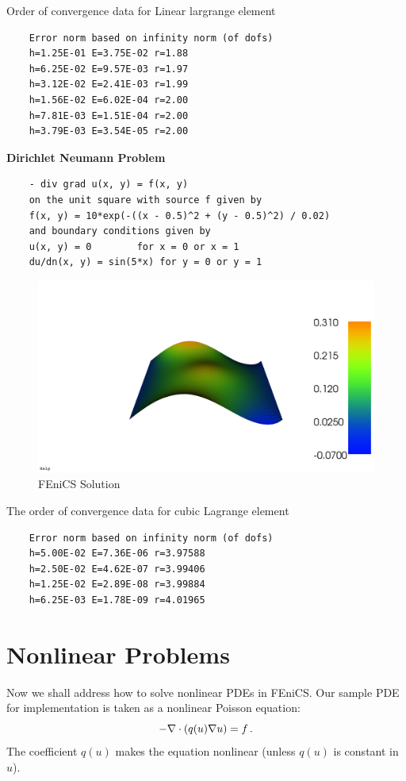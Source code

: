 Order of convergence data for Linear largrange element
\begin{lstlisting}
	Error norm based on infinity norm (of dofs)
	h=1.25E-01 E=3.75E-02 r=1.88
	h=6.25E-02 E=9.57E-03 r=1.97
	h=3.12E-02 E=2.41E-03 r=1.99
	h=1.56E-02 E=6.02E-04 r=2.00
	h=7.81E-03 E=1.51E-04 r=2.00
	h=3.79E-03 E=3.54E-05 r=2.00
\end{lstlisting}
\pagebreak
\noindent \textbf{Dirichlet Neumann Problem}
\begin{lstlisting}
	- div grad u(x, y) = f(x, y)
	on the unit square with source f given by
	f(x, y) = 10*exp(-((x - 0.5)^2 + (y - 0.5)^2) / 0.02)
	and boundary conditions given by
	u(x, y) = 0        for x = 0 or x = 1
	du/dn(x, y) = sin(5*x) for y = 0 or y = 1
\end{lstlisting}
\begin{figure}[h]
	\center
	\includegraphics[scale = 0.25]{images/dn.png}
	\caption{FEniCS Solution}
\end{figure}
\noindent The order of convergence data for cubic Lagrange element
\begin{lstlisting}
	Error norm based on infinity norm (of dofs)
	h=5.00E-02 E=7.36E-06 r=3.97588
	h=2.50E-02 E=4.62E-07 r=3.99406
	h=1.25E-02 E=2.89E-08 r=3.99884
	h=6.25E-03 E=1.78E-09 r=4.01965
\end{lstlisting}

\pagebreak
\section{Nonlinear Problems}
Now we shall address how to solve nonlinear PDEs in FEniCS. Our sample PDE for implementation is taken as a nonlinear Poisson equation:
\begin{equation}
-\nabla\cdot\left( q(u)\nabla u\right) = f\thinspace .
\end{equation}
The coefficient $q(u)$ makes the equation nonlinear (unless $q(u)$ is constant in $u$).

